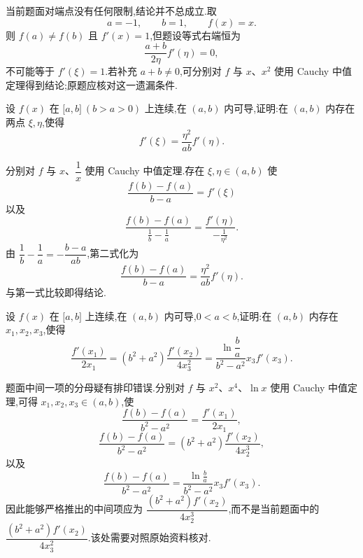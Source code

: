 \begin{solution}
    当前题面对端点没有任何限制,结论并不总成立.取
    \[
        a=-1,
        \qquad b=1,
        \qquad f(x)=x.
    \]
    则 $f(a)\neq f(b)$ 且 $f'(x)=1$,但题设等式右端恒为
    \[
        \dfrac{a+b}{2\eta}f'(\eta)=0,
    \]
    不可能等于 $f'(\xi)=1$.若补充 $a+b\neq0$,可分别对 $f$ 与 $x$、$x^2$ 使用 Cauchy 中值定理得到结论;原题应核对这一遗漏条件.
\end{solution}

\begin{example}
    设 $f(x)$ 在 $\lbrack a,b\rbrack\ (b>a>0)$ 上连续,在 $(a,b)$ 内可导,证明:在 $(a,b)$ 内存在两点 $\xi,\eta$,使得
    \[
        f'(\xi)=\dfrac{\eta^2}{ab}f'(\eta).
    \]
\end{example}
\exampleblank

\begin{solution}
    分别对 $f$ 与 $x$、$\dfrac{1}{x}$ 使用 Cauchy 中值定理.存在 $\xi,\eta\in(a,b)$ 使
    \[
        \dfrac{f(b)-f(a)}{b-a}=f'(\xi)
    \]
    以及
    \[
        \dfrac{f(b)-f(a)}{\frac{1}{b}-\frac{1}{a}}
        =\dfrac{f'(\eta)}{-\frac{1}{\eta^2}}.
    \]
    由 $\dfrac{1}{b}-\dfrac{1}{a}=-\dfrac{b-a}{ab}$,第二式化为
    \[
        \dfrac{f(b)-f(a)}{b-a}
        =\dfrac{\eta^2}{ab}f'(\eta).
    \]
    与第一式比较即得结论.
\end{solution}

\begin{example}
    设 $f(x)$ 在 $\lbrack a,b\rbrack$ 上连续,在 $(a,b)$ 内可导,$0<a<b$,证明:在 $(a,b)$ 内存在 $x_1,x_2,x_3$,使得
    \[
        \dfrac{f'(x_1)}{2x_1}
        =(b^2+a^2)\dfrac{f'(x_2)}{4x_3^2}
        =\dfrac{\ln\dfrac{b}{a}}{b^2-a^2}x_3f'(x_3).
    \]
\end{example}
\exampleblank

\begin{solution}
    题面中间一项的分母疑有排印错误.分别对 $f$ 与 $x^2$、$x^4$、$\ln x$ 使用 Cauchy 中值定理,可得 $x_1,x_2,x_3\in(a,b)$,使
    \[
        \dfrac{f(b)-f(a)}{b^2-a^2}
        =\dfrac{f'(x_1)}{2x_1},
    \]
    \[
        \dfrac{f(b)-f(a)}{b^2-a^2}
        =(b^2+a^2)\dfrac{f'(x_2)}{4x_2^3},
    \]
    以及
    \[
        \dfrac{f(b)-f(a)}{b^2-a^2}
        =\dfrac{\ln\frac{b}{a}}{b^2-a^2}x_3f'(x_3).
    \]
    因此能够严格推出的中间项应为 $\dfrac{(b^2+a^2)f'(x_2)}{4x_2^3}$,而不是当前题面中的 $\dfrac{(b^2+a^2)f'(x_2)}{4x_3^2}$.该处需要对照原始资料核对.
\end{solution}


